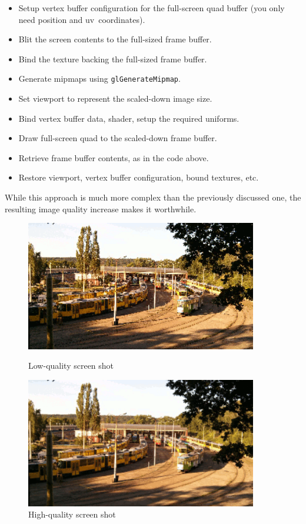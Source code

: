 \documentclass[hidelinks,titlepage,a4paper]{article}
\begin{document}
\begin{itemize}
\item Setup vertex buffer configuration for the full-screen quad buffer (you only need position and uv~coordinates).
\item Blit the screen contents to the full-sized frame buffer.
\item Bind the texture backing the full-sized frame buffer.
\item Generate mipmaps using \texttt{glGenerateMipmap}.
\item Set viewport to represent the scaled-down image size.
\item Bind vertex buffer data, shader, setup the required uniforms.
\item Draw full-screen quad to the scaled-down frame buffer.
\item Retrieve frame buffer contents, as in the code above.
\item Restore viewport, vertex buffer configuration, bound textures, etc.
\end{itemize}

While this approach is much more complex than the previously discussed one, the resulting image quality increase makes it worthwhile.

\begin{figure}[h]
\centering
\begin{minipage}{0.45\textwidth}
\centering
\includegraphics[width=0.9\textwidth]{images/screenshot-lo.png}
\caption{Low-quality screen shot}
\label{lowqualityss}
\end{minipage}\hfill
\begin{minipage}{0.45\textwidth}
\centering
\includegraphics[width=0.9\textwidth]{images/screenshot-hi.png}
\caption{High-quality screen shot}
\label{highqualityss}
\end{minipage}
\end{figure}
\end{document}
